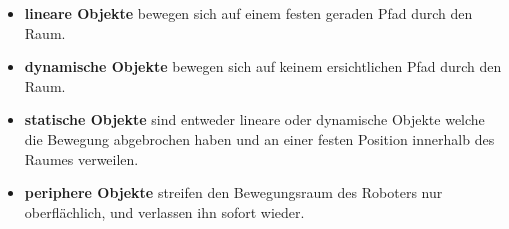 \begin{itemize}
\item \textbf{lineare Objekte} bewegen sich auf einem festen geraden Pfad durch den Raum.
\item \textbf{dynamische Objekte} bewegen sich auf keinem ersichtlichen Pfad durch den Raum.
\item \textbf{statische Objekte} sind entweder lineare oder dynamische Objekte welche die Bewegung abgebrochen haben und an einer festen Position innerhalb des Raumes verweilen.
\item \textbf{periphere Objekte} streifen den Bewegungsraum des Roboters nur oberflächlich, und verlassen ihn sofort wieder.
\end{itemize}

